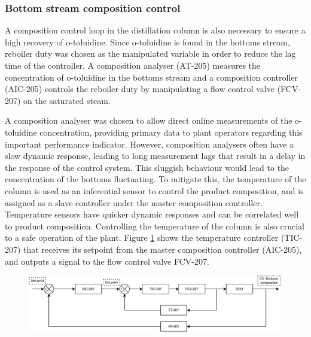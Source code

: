\subsubsection{Bottom stream composition control} %
A composition control loop in the distillation column is also necessary to ensure a high recovery of o-toluidine. Since o-toluidine is found in the bottoms stream, reboiler duty was chosen as the manipulated variable in order to reduce the lag time of the controller. A composition analyser (AT-205) measures the concentration of o-toluidine in the bottoms stream and a composition controller (AIC-205) controls the reboiler duty by manipulating a flow control valve (FCV-207) on the saturated steam. 

A composition analyser was chosen to allow direct online measurements of the o-toluidine concentration, providing primary data to plant operators regarding this important performance indicator. However, composition analysers often have a slow dynamic response, leading to long measurement lags that result in a delay in the response of the control system. This sluggish behaviour would lead to the concentration of the bottoms fluctuating. To mitigate this, the temperature of the column is used as an inferential sensor to control the product composition, and is assigned as a slave controller under the master composition controller. Temperature sensors have quicker dynamic responses and can be correlated well to product composition. Controlling the temperature of the column is also crucial to a safe operation of the plant. Figure \ref{fig:S201-CC} shows the temperature controller (TIC-207) that receives its setpoint from the master composition controller (AIC-205), and outputs a signal to the flow control valve FCV-207.

\begin{figure}[H]
    \centering
    \includegraphics[width=0.8\linewidth]{chapters/4-operation-control/4-Figures/S201-CC.pdf}
    \caption{}
    \label{fig:S201-CC}
\end{figure}



